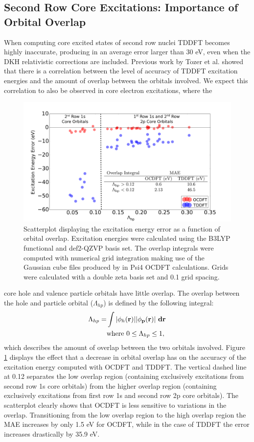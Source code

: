 \documentclass[11.5pt]{article}
\begin{document}
\subsection{Second Row Core Excitations: Importance of Orbital Overlap}
When computing core excited states of second row nuclei TDDFT becomes highly inaccurate, producing in an average error larger than 30 eV, even when the DKH relativistic corrections are included. Previous work by Tozer et al.\cite{peach_excitation_2008}  showed that there is a correlation between the level of accuracy of TDDFT excitation energies and the amount of overlap between the orbitals involved. We expect this correlation to also be observed in core electron excitations, where the
\begin{figure}[ht]
\includegraphics[scale=0.17]{scatterNEW.pdf}
\caption{Scatterplot displaying the excitation energy error as a function of orbital overlap. Excitation energies were calculated using the B3LYP functional and def2-QZVP basis set. The overlap integrals were computed with numerical grid integration making use of the Gaussian cube files produced by in Psi4 OCDFT calculations. Grids were calculated with a double zeta basis set and 0.1 grid spacing.}
\label{figure:scatter}
\end{figure}
core hole and valence particle orbitals have little overlap. The overlap between the hole and particle orbital ($\Lambda_{hp}$) is defined by the following integral:
\begin{align}
\Lambda_{hp} = &\int |\phi_h (\bf{r})||\phi_p (\bf{r})| \ d\bf{r} \\ &\text{where} \ 0 \leq \Lambda_{hp} \leq 1 , \nonumber
\end{align}
which describes the amount of overlap between the two orbitals involved. Figure \ref{figure:scatter} displays the effect that a decrease in orbital overlap has on the accuracy of the excitation energy computed with OCDFT and TDDFT. The vertical dashed line at 0.12 separates the low overlap region (containing exclusively excitations from second row 1s core orbitals) from the higher overlap region (containing exclusively excitations from first row 1s and second row 2p core orbitals). The scatterplot clearly shows that OCDFT is less sensitive to variations in the overlap. Transitioning from the low overlap region to the high overlap region the MAE increases by only 1.5 eV for OCDFT, while in the case of TDDFT the error increases drastically by 35.9 eV.\\ \\
\end{document}
